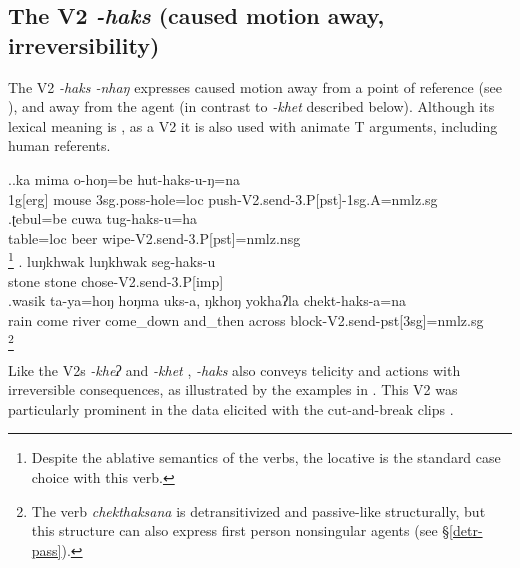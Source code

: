 \subsection{The V2 \emph{-haks} (caused motion away, irreversibility)}\label{V2-send}%

The V2 \emph{-haks \ti -nhaŋ}  expresses caused motion away from a point of reference (see \Next),  and away from the agent (in contrast to \emph{-khet}  described below).  Although its lexical meaning is , as a V2 it is also used with animate T arguments, including human referents.


\ex.\ag.ka mima o-hoŋ=be hut-haks-u-ŋ=na\\
{\sc 1g[erg]} mouse  {\sc 3sg.poss-}hole{\sc =loc} push{\sc -V2.send-3.P[pst]-1sg.A=nmlz.sg}\\
\bg.ʈebul=be cuwa tug-haks-u=ha\\
table{\sc =loc} beer wipe{\sc -V2.send-3.P[pst]=nmlz.nsg}\\
\footnote{Despite the ablative semantics of the verbs, the locative is the standard case choice with this verb.}
\bg. luŋkhwak luŋkhwak seg-haks-u\\
stone stone chose{\sc -V2.send-3.P[imp]}\\
\bg.wasik ta-ya=hoŋ hoŋma uks-a, ŋkhoŋ yokhaʔla chekt-haks-a=na\\
rain  come river come\_down and\_then across block{\sc -V2.send-pst[3sg]=nmlz.sg}\\
\footnote{The verb \emph{chekthaksana} is detransitivized and passive-like structurally, but this structure can also express first person nonsingular agents (see §\ref{detr-pass}).}


Like the V2s \emph{-kheʔ}  and \emph{-khet} , \emph{-haks}  also conveys telicity and actions with irreversible consequences, as illustrated by the examples in \Next. This V2 was  particularly prominent in the data elicited with the cut-and-break clips   \citep{Bohnemeyeretal2010_cut}.

